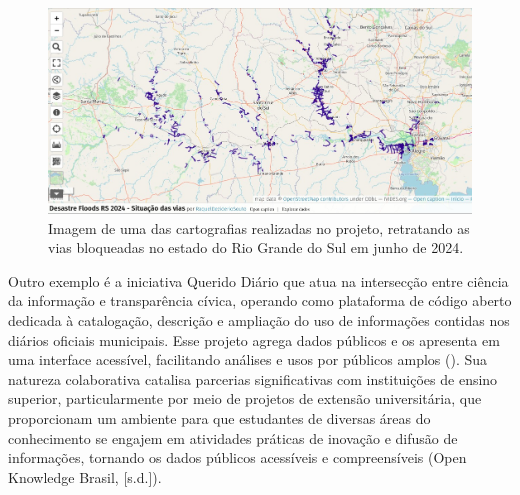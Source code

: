 \documentclass[portuguese]{textolivre}
\begin{document}
\begin{figure}[htbp]
\centering
\begin{minipage}{.75\textwidth}
 \includegraphics[width=\textwidth]{figure01.jpg}
 \caption{Imagem de uma das cartografias realizadas no projeto,
retratando as vias bloqueadas no estado do Rio Grande do Sul em junho de
2024.}
 \label{fig01}
\end{minipage}
\end{figure}

Outro exemplo é a iniciativa Querido Diário que atua na intersecção
entre ciência da informação e transparência cívica, operando como
plataforma de código aberto dedicada à catalogação, descrição e
ampliação do uso de informações contidas nos diários oficiais
municipais. Esse projeto agrega dados públicos e os apresenta em uma
interface acessível, facilitando análises e usos por públicos amplos
(). Sua natureza colaborativa catalisa parcerias significativas
com instituições de ensino superior, particularmente por meio de
projetos de extensão universitária, que proporcionam um ambiente para
que estudantes de diversas áreas do conhecimento se engajem em
atividades práticas de inovação e difusão de informações, tornando os
dados públicos acessíveis e compreensíveis (Open Knowledge Brasil,
{[}s.d.{]}).
\end{document}
